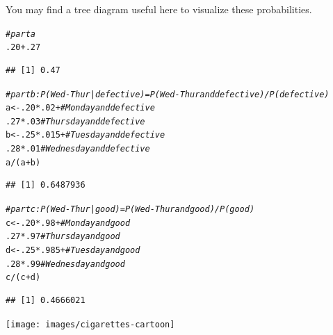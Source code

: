 \documentclass[twoside]{book}\usepackage[]{graphicx}\usepackage[]{xcolor}
\makeatletter
\newcommand{\hlnum}[1]{\textcolor[rgb]{0.686,0.059,0.569}{#1}}%
\newcommand{\hlcom}[1]{\textcolor[rgb]{0.678,0.584,0.686}{\textit{#1}}}%
\newcommand{\hlopt}[1]{\textcolor[rgb]{0,0,0}{#1}}%
\newcommand{\hlstd}[1]{\textcolor[rgb]{0.345,0.345,0.345}{#1}}%
\newcommand{\hlkwb}[1]{\textcolor[rgb]{0.69,0.353,0.396}{#1}}%
\newenvironment{kframe}{%
 \def\at@end@of@kframe{}%
 \ifinner\ifhmode%
  \def\at@end@of@kframe{\end{minipage}}%
  \begin{minipage}{\columnwidth}%
 \fi\fi%
 \def\FrameCommand##1{\hskip\@totalleftmargin \hskip-\fboxsep
 \colorbox{shadecolor}{##1}\hskip-\fboxsep
     \hskip-\linewidth \hskip-\@totalleftmargin \hskip\columnwidth}%
 \MakeFramed {\advance\hsize-\width
   \@totalleftmargin\z@ \linewidth\hsize
   \@setminipage}}%
 {\par\unskip\endMakeFramed%
 \at@end@of@kframe}
\newenvironment{knitrout}{}{} %
\newif\ifsolutions
\newif\ifsolutionslocal
\makeatother
\begin{document}
\begin{solution}
You may find a tree diagram useful here to visualize these probabilities.
\begin{knitrout}
\color{fgcolor}\begin{kframe}
\begin{alltt}
\hlcom{# part a}
\hlnum{.20} \hlopt{+} \hlnum{.27}
\end{alltt}
\begin{verbatim}
## [1] 0.47
\end{verbatim}
\begin{alltt}
\hlcom{# part b: P( Wed-Thur | defective ) = P( Wed-Thur and defective ) / P(defective)}
\hlstd{a} \hlkwb{<-} \hlnum{.20} \hlopt{*} \hlnum{.02} \hlopt{+}       \hlcom{# Monday and defective}
     \hlnum{.27} \hlopt{*} \hlnum{.03}         \hlcom{# Thursday and defective}
\hlstd{b} \hlkwb{<-} \hlnum{.25} \hlopt{*} \hlnum{.015} \hlopt{+}      \hlcom{# Tuesday and defective}
     \hlnum{.28} \hlopt{*} \hlnum{.01}         \hlcom{# Wednesday and defective }
\hlstd{a} \hlopt{/} \hlstd{(a} \hlopt{+} \hlstd{b)}
\end{alltt}
\begin{verbatim}
## [1] 0.6487936
\end{verbatim}
\begin{alltt}
\hlcom{# part c: P( Wed-Thur | good ) = P( Wed-Thur and good ) / P(good)}
\hlstd{c} \hlkwb{<-} \hlnum{.20} \hlopt{*} \hlnum{.98} \hlopt{+}       \hlcom{# Monday and good}
     \hlnum{.27} \hlopt{*} \hlnum{.97}         \hlcom{# Thursday and good}
\hlstd{d} \hlkwb{<-} \hlnum{.25} \hlopt{*} \hlnum{.985} \hlopt{+}      \hlcom{# Tuesday and good}
     \hlnum{.28} \hlopt{*} \hlnum{.99}         \hlcom{# Wednesday and good }
\hlstd{c} \hlopt{/} \hlstd{(c} \hlopt{+} \hlstd{d)}
\end{alltt}
\begin{verbatim}
## [1] 0.4666021
\end{verbatim}
\end{kframe}
\end{knitrout}
\end{solution}


\shipoutProblems

\vfill

\begin{center}
	\texttt{[image: images/cigarettes-cartoon]}
\end{center}

\ifsolutions
\ifsolutionslocal
\newpage
\section*{Solutions}
\shipoutSolutions
\fi
\fi
\end{document}
